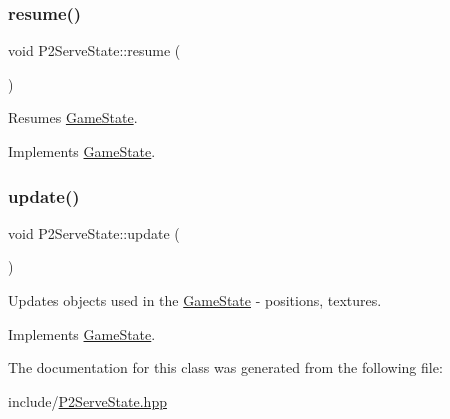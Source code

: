 \subsubsection{\texorpdfstring{resume()}{resume()}}
{\footnotesize\ttfamily void P2\+Serve\+State\+::resume (\begin{DoxyParamCaption}{ }\end{DoxyParamCaption})\hspace{0.3cm}{\ttfamily [virtual]}}



Resumes \mbox{\hyperlink{class_game_state}{Game\+State}}. 



Implements \mbox{\hyperlink{class_game_state_a4a421c44f4dae6e9a4fbe10b6e8c47ac}{Game\+State}}.

\mbox{\label{class_p2_serve_state_a1f0ddd25c72c4e9033418a32f5389e22}} 
\subsubsection{\texorpdfstring{update()}{update()}}
{\footnotesize\ttfamily void P2\+Serve\+State\+::update (\begin{DoxyParamCaption}\item[{\mbox{\hyperlink{class_game_engine}{Game\+Engine}} $\ast$}]{ }\end{DoxyParamCaption})\hspace{0.3cm}{\ttfamily [virtual]}}



Updates objects used in the \mbox{\hyperlink{class_game_state}{Game\+State}} -\/ positions, textures. 



Implements \mbox{\hyperlink{class_game_state_a66b11afe355a9479f94aaf76576980bd}{Game\+State}}.



The documentation for this class was generated from the following file\+:\begin{DoxyCompactItemize}
\item 
include/\mbox{\hyperlink{_p2_serve_state_8hpp}{P2\+Serve\+State.\+hpp}}\end{DoxyCompactItemize}
